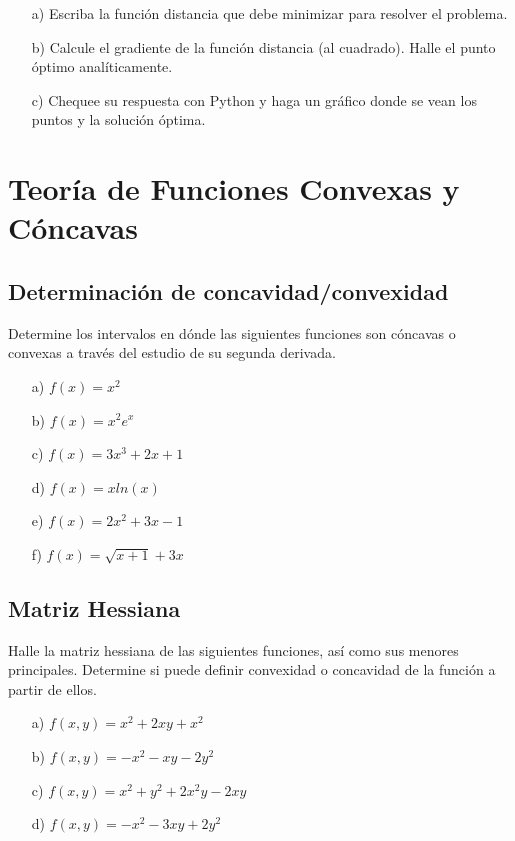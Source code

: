 \documentclass[12pt]{article}
\begin{document}
\begin{itemize}
    \item[a)] Escriba la función distancia que debe minimizar para resolver el problema.
    \item[b)] Calcule el gradiente de la función distancia (al cuadrado). Halle el punto óptimo analíticamente.
    \item[c)] Chequee su respuesta con Python y haga un gráfico donde se vean los puntos y la solución óptima.
\end{itemize}

\section*{Teoría de Funciones Convexas y Cóncavas}

\subsection{Determinación de concavidad/convexidad}

Determine los intervalos en dónde las siguientes funciones son cóncavas o convexas a través del estudio de su segunda derivada. 
\begin{itemize}
    \item[a)] $f(x) = x^2$
    \item[b)] $f(x) = x^2 e^{x}$
    \item[c)] $f(x) = 3x^3 + 2x + 1$
    \item[d)] $f(x) = x ln(x)$
    \item[e)] $f(x) = 2 x^2 + 3x - 1 $
    \item[f)] $f(x) = \sqrt{x+1} + 3x $    
\end{itemize}

\subsection{Matriz Hessiana}

Halle la matriz hessiana de las siguientes funciones, así como sus menores principales. Determine si puede definir convexidad o concavidad de la función a partir de ellos. 

\begin{itemize}
    \item[a)] $f(x,y) = x^2 + 2xy + x^2$
    \item[b)] $f(x,y) = -x^2 -xy -2y^2$
    \item[c)] $f(x,y) = x^2 + y^2 +2x^2y - 2xy $
    \item[d)] $f(x,y) = -x^2 -3xy+2y^2$
\end{itemize}
\end{document}
